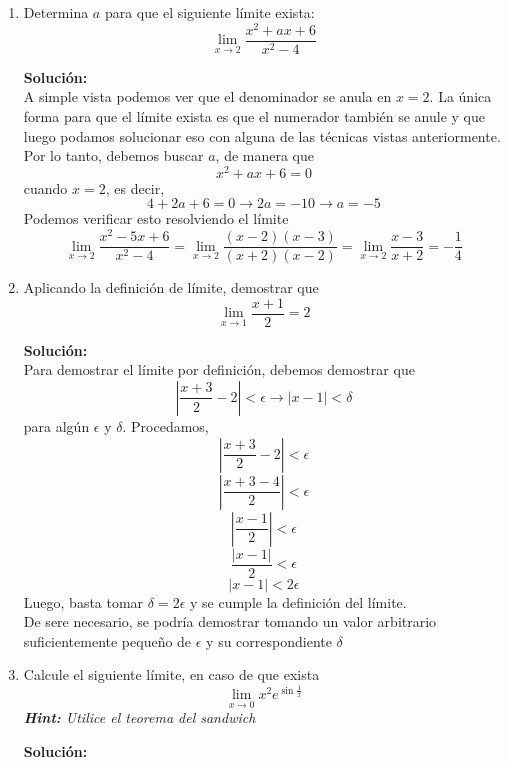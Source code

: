 \documentclass[12pt]{article}
\newenvironment{solucion}
{\begin{mdframed}[backgroundcolor=black!10]
		{\bf Solución:}\\
	}
	{
	\end{mdframed}
}
\newenvironment{preguntas}
{\begin{enumerate}\itemsep12pt
	}
	{
	\end{enumerate}
}
\newcommand{\ra}{\rightarrow}
\begin{document}
\begin{preguntas}
\begin{solucion}
\begin{enumerate}[a)]
\[\begin{array}{rrrrrr}
& 1 & 3& 0 & 4 & 0
\end{array}
\]
por lo que $x^4+2x^3-3x^2+4x-4 : x-1 = x^3+3x^2+4$\\
Luego, $x^4+2x-3 : x-1$, esto es,
\[
\renewcommand\arraystretch{1.5}
\setlength\doublerulesep{0pt}
\begin{array}{rrrrrr}
\multicolumn{1}{r|}{1} & 1 & 0 & 0 & 2 & -3\\\cline{2-6}
& & 1& 1 & 1 & 3\\\cline{2-6}
& 1 & 1& 1 & 3 & 0
\end{array}
\]
por lo que $x^4+2x-3 : x-1 = x^3+x^2+x+3$
Entonces, podemos escribir el límite como
$$\lim\limits_{x \ra 1} \dfrac{(x^3+3x^2+4)(x-1)}{(x^3+x^2+x+3)(x-1)}
= \lim\limits_{x \ra 1} \dfrac{(x^3+3x^2+4)}{(x^3+x^2+x+3)}
= \dfrac{8}{6} = \dfrac{4}{3}$$
\item 
\item 
\end{enumerate}
\end{solucion}
\item Determina $a$ para que el siguiente límite exista:
$$ \lim\limits_{x \ra 2} \dfrac{x^2+ax+6}{x^2-4} $$
\begin{solucion}
A simple vista podemos ver que el denominador se anula en $x=2$. La única forma para que el límite exista es que el numerador también se anule y que luego podamos solucionar eso con alguna de las técnicas vistas anteriormente.\\
Por lo tanto, debemos buscar $a$, de manera que
$$x^2+ax+6 = 0$$
cuando $x=2$, es decir,
$$4+2a+6 = 0 \ra 2a = -10 \ra a = -5$$
Podemos verificar esto resolviendo el límite
$$ \lim\limits_{x \ra 2} \dfrac{x^2-5x+6}{x^2-4}
= \lim\limits_{x \ra 2} \dfrac{(x-2)(x-3)}{(x+2)(x-2)}
= \lim\limits_{x \ra 2} \dfrac{x-3}{x+2}
= -\dfrac{1}{4} $$
\end{solucion}
\item Aplicando la definición de límite, demostrar que
$$\lim\limits_{x \ra 1} \dfrac{x+1}{2} = 2$$
\begin{solucion}
Para demostrar el límite por definición, debemos demostrar que
$$\left| \dfrac{x+3}{2} - 2 \right| < \epsilon \ra |x-1| < \delta$$
para algún $\epsilon$ y $\delta$. Procedamos,
$$\left| \dfrac{x+3}{2} - 2 \right| < \epsilon$$
$$\left| \dfrac{x+3-4}{2} \right| < \epsilon$$
$$\left| \dfrac{x-1}{2} \right| < \epsilon$$
$$ \dfrac{|x-1|}{2} < \epsilon$$
$$ |x-1| < 2\epsilon$$
Luego, basta tomar $\delta = 2 \epsilon$ y se cumple la definición del límite. \\
De sere necesario, se podría demostrar tomando un valor arbitrario suficientemente pequeño de $\epsilon$ y su correspondiente $\delta$
\end{solucion}
\item Calcule el siguiente límite, en caso de que exista
$$ \lim\limits_{x \ra 0} x^2e^{\sin{\frac{1}{x}}} $$
\textit{\textbf{Hint:} Utilice el teorema del sandwich}
\begin{solucion}

\end{solucion}
\end{preguntas}
\end{document}

